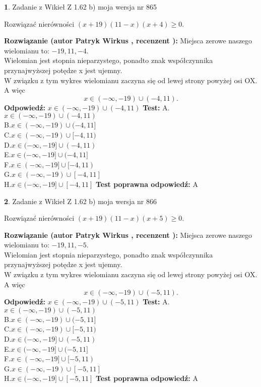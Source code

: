 \documentclass[12pt, a4paper]{article}
\theoremstyle{definition} %
\newtheorem{zad}{}
\newcommand{\zadStart}[1]{\begin{zad}#1\newline}
\newcommand{\zadStop}{\end{zad}}
\newcommand{\rozwStart}[2]{\noindent \textbf{Rozwiązanie (autor #1 , recenzent #2): }\newline}
\newcommand{\rozwStop}{\newline}
\newcommand{\odpStart}{\noindent \textbf{Odpowiedź:}\newline}
\newcommand{\odpStop}{\newline}
\newcommand{\testStart}{\noindent \textbf{Test:}\newline}
\newcommand{\testStop}{\newline}
\newcommand{\kluczStart}{\noindent \textbf{Test poprawna odpowiedź:}\newline}
\newcommand{\kluczStop}{\newline}
\begin{document}
\zadStart{Zadanie z Wikieł Z 1.62 b) moja wersja nr 865}

Rozwiązać nierówności $(x+19)(11-x)(x+4)\ge0$.
\zadStop
\rozwStart{Patryk Wirkus}{}
Miejsca zerowe naszego wielomianu to: $-19, 11, -4$.\\
Wielomian jest stopnia nieparzystego, ponadto znak współczynnika przy\linebreak najwyższej potędze x jest ujemny.\\ W związku z tym wykres wielomianu zaczyna się od lewej strony powyżej osi OX. A więc $$x \in (-\infty,-19) \cup (-4,11).$$
\rozwStop
\odpStart
$x \in (-\infty,-19) \cup (-4,11)$
\odpStop
\testStart
A.$x \in (-\infty,-19) \cup (-4,11)$\\
B.$x \in (-\infty,-19) \cup (-4,11]$\\
C.$x \in (-\infty,-19) \cup [-4,11)$\\
D.$x \in (-\infty,-19] \cup (-4,11)$\\
E.$x \in (-\infty,-19] \cup (-4,11]$\\
F.$x \in (-\infty,-19] \cup [-4,11)$\\
G.$x \in (-\infty,-19) \cup [-4,11]$\\
H.$x \in (-\infty,-19] \cup [-4,11]$
\testStop
\kluczStart
A
\kluczStop



\zadStart{Zadanie z Wikieł Z 1.62 b) moja wersja nr 866}

Rozwiązać nierówności $(x+19)(11-x)(x+5)\ge0$.
\zadStop
\rozwStart{Patryk Wirkus}{}
Miejsca zerowe naszego wielomianu to: $-19, 11, -5$.\\
Wielomian jest stopnia nieparzystego, ponadto znak współczynnika przy\linebreak najwyższej potędze x jest ujemny.\\ W związku z tym wykres wielomianu zaczyna się od lewej strony powyżej osi OX. A więc $$x \in (-\infty,-19) \cup (-5,11).$$
\rozwStop
\odpStart
$x \in (-\infty,-19) \cup (-5,11)$
\odpStop
\testStart
A.$x \in (-\infty,-19) \cup (-5,11)$\\
B.$x \in (-\infty,-19) \cup (-5,11]$\\
C.$x \in (-\infty,-19) \cup [-5,11)$\\
D.$x \in (-\infty,-19] \cup (-5,11)$\\
E.$x \in (-\infty,-19] \cup (-5,11]$\\
F.$x \in (-\infty,-19] \cup [-5,11)$\\
G.$x \in (-\infty,-19) \cup [-5,11]$\\
H.$x \in (-\infty,-19] \cup [-5,11]$
\testStop
\kluczStart
A
\kluczStop
\end{document}
